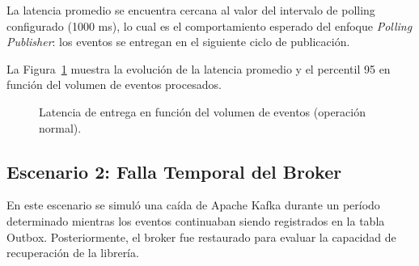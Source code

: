 La latencia promedio se encuentra cercana al valor del intervalo de polling configurado (1000 ms), lo cual es el comportamiento esperado del enfoque \textit{Polling Publisher}: los eventos se entregan en el siguiente ciclo de publicación.

La Figura~\ref{fig:latencia_normal} muestra la evolución de la latencia promedio y el percentil 95 en función del volumen de eventos procesados.

\begin{figure}[H]
    \centering
    \caption{Latencia de entrega en función del volumen de eventos (operación normal).}
    \label{fig:latencia_normal}
\end{figure}

\subsection{Escenario 2: Falla Temporal del Broker}

En este escenario se simuló una caída de Apache Kafka durante un período determinado mientras los eventos continuaban siendo registrados en la tabla Outbox. Posteriormente, el broker fue restaurado para evaluar la capacidad de recuperación de la librería.

